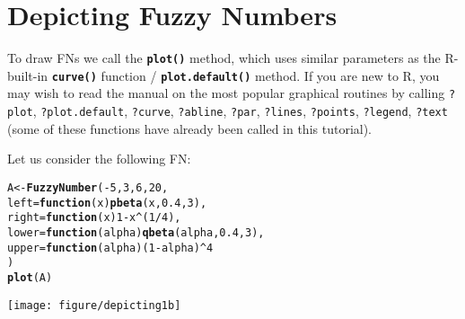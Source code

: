 \documentclass[11pt]{article}\usepackage[]{graphicx}\usepackage[]{color}
\makeatletter
\newcommand{\hlnum}[1]{\textcolor[rgb]{0.686,0.059,0.569}{#1}}%
\newcommand{\hlopt}[1]{\textcolor[rgb]{0,0,0}{#1}}%
\newcommand{\hlstd}[1]{\textcolor[rgb]{0.345,0.345,0.345}{#1}}%
\newcommand{\hlkwa}[1]{\textcolor[rgb]{0.161,0.373,0.58}{\textbf{#1}}}%
\newcommand{\hlkwb}[1]{\textcolor[rgb]{0.69,0.353,0.396}{#1}}%
\newcommand{\hlkwc}[1]{\textcolor[rgb]{0.333,0.667,0.333}{#1}}%
\newcommand{\hlkwd}[1]{\textcolor[rgb]{0.737,0.353,0.396}{\textbf{#1}}}%
\newenvironment{kframe}{%
 \def\at@end@of@kframe{}%
 \ifinner\ifhmode%
  \def\at@end@of@kframe{\end{minipage}}%
  \begin{minipage}{\columnwidth}%
 \fi\fi%
 \def\FrameCommand##1{\hskip\@totalleftmargin \hskip-\fboxsep
 \colorbox{shadecolor}{##1}\hskip-\fboxsep
     \hskip-\linewidth \hskip-\@totalleftmargin \hskip\columnwidth}%
 \MakeFramed {\advance\hsize-\width
   \@totalleftmargin\z@ \linewidth\hsize
   \@setminipage}}%
 {\par\unskip\endMakeFramed%
 \at@end@of@kframe}
\newenvironment{knitrout}{}{} %
\newcommand{\lang}[1]{\textsf{#1}\xspace}
\newcommand{\R}{\lang{R}}
\newcommand{\func}[1]{\texttt{\hlkwd{#1}}}
\makeatother
\begin{document}




\section{Depicting Fuzzy Numbers}\label{Sec:Depicting}


To draw FNs we call the \func{plot()} method,
which uses similar parameters as the \R-built-in
\func{curve()} function / \func{plot.default()} method.
If you are new to \R, you may wish
to read the manual on the most popular graphical routines by
calling \texttt{?plot}, \texttt{?plot.default}, \texttt{?curve},
\texttt{?abline}, \texttt{?par}, \texttt{?lines}, \texttt{?points},
\texttt{?legend}, \texttt{?text} (some of these functions have
already been called in this tutorial).

Let us consider the following FN:

\begin{knitrout}\small
{}\color{fgcolor}\begin{kframe}
\begin{alltt}
\hlstd{A} \hlkwb{<-} \hlkwd{FuzzyNumber}\hlstd{(}\hlopt{-}\hlnum{5}\hlstd{,} \hlnum{3}\hlstd{,} \hlnum{6}\hlstd{,} \hlnum{20}\hlstd{,}
    \hlkwc{left}\hlstd{=}\hlkwa{function}\hlstd{(}\hlkwc{x}\hlstd{)} \hlkwd{pbeta}\hlstd{(x,}\hlnum{0.4}\hlstd{,}\hlnum{3}\hlstd{),}
   \hlkwc{right}\hlstd{=}\hlkwa{function}\hlstd{(}\hlkwc{x}\hlstd{)} \hlnum{1}\hlopt{-}\hlstd{x}\hlopt{^}\hlstd{(}\hlnum{1}\hlopt{/}\hlnum{4}\hlstd{),}
   \hlkwc{lower}\hlstd{=}\hlkwa{function}\hlstd{(}\hlkwc{alpha}\hlstd{)} \hlkwd{qbeta}\hlstd{(alpha,}\hlnum{0.4}\hlstd{,}\hlnum{3}\hlstd{),}
   \hlkwc{upper}\hlstd{=}\hlkwa{function}\hlstd{(}\hlkwc{alpha}\hlstd{) (}\hlnum{1}\hlopt{-}\hlstd{alpha)}\hlopt{^}\hlnum{4}
\hlstd{)}
\hlkwd{plot}\hlstd{(A)}
\end{alltt}
\end{kframe}
\end{knitrout}

\begin{center}
\begin{knitrout}\small
{}\color{fgcolor}

{\centering \texttt{[image: figure/depicting1b]} 

}



\end{knitrout}
\end{center}
\end{document}
